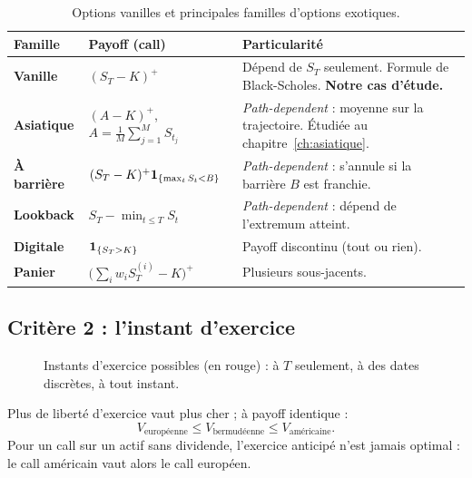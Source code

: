 \begin{table}[H]
\centering\small
\begin{tabularx}{\textwidth}{>{\bfseries}p{2.4cm}p{4.6cm}L}
\toprule
Famille & Payoff (call) & Particularité \\
\midrule
Vanille & $(S_T-K)^+$ & Dépend de $S_T$ seulement. Formule de Black-Scholes. \textbf{Notre cas d'étude.} \\
Asiatique & $(A-K)^+$, $A = \frac1M\sum_{j=1}^M S_{t_j}$ & \emph{Path-dependent} : moyenne sur la trajectoire. Étudiée au chapitre~\ref{ch:asiatique}. \\
À barrière & $(S_T-K)^+\mathbf{1}_{\{\max_t S_t < B\}}$ & \emph{Path-dependent} : s'annule si la barrière $B$ est franchie. \\
Lookback & $S_T - \min_{t\le T}S_t$ & \emph{Path-dependent} : dépend de l'extremum atteint. \\
Digitale & $\mathbf{1}_{\{S_T>K\}}$ & Payoff discontinu (tout ou rien). \\
Panier & $\big(\sum_i w_iS_T^{(i)} - K\big)^+$ & Plusieurs sous-jacents. \\
\bottomrule
\end{tabularx}
\caption{Options vanilles et principales familles d'options exotiques.}
\end{table}

\subsection{Critère 2 : l'instant d'exercice}

\begin{figure}[H]
\centering
{}
\caption{Instants d'exercice possibles (en rouge) : à $T$ seulement, à des dates discrètes, à tout instant.}
\end{figure}

Plus de liberté d'exercice vaut plus cher ; à payoff identique :
\[
V_{\text{européenne}} \le V_{\text{bermudéenne}} \le V_{\text{américaine}}.
\]
Pour un call sur un actif sans dividende, l'exercice anticipé n'est jamais optimal : le call américain vaut alors le call européen.

